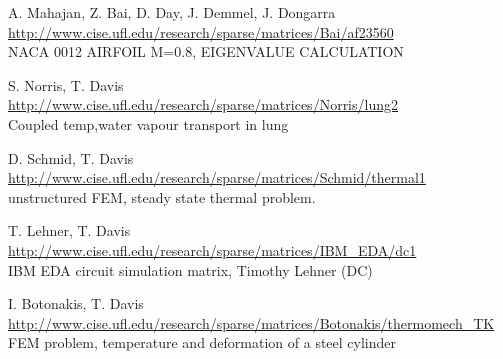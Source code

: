 	{
		{
			 A. Mahajan, Z. Bai, D. Day, J. Demmel, J. Dongarra 
		}
		{
			\url{http://www.cise.ufl.edu/research/sparse/matrices/Bai/af23560 } \\
			 NACA 0012 AIRFOIL  M=0.8, EIGENVALUE CALCULATION
		}
	}
	
	{
		{
			S. Norris, T. Davis
		}
		{
			\url{http://www.cise.ufl.edu/research/sparse/matrices/Norris/lung2} \\
			Coupled temp,water vapour transport in lung
		}
	}

	{
		{
			D. Schmid, T. Davis 
		}
		{
			\url{http://www.cise.ufl.edu/research/sparse/matrices/Schmid/thermal1} \\
			unstructured FEM, steady state thermal problem.
		}
	}

	{
		{
			T. Lehner, T. Davis 
		}
		{
			\url{http://www.cise.ufl.edu/research/sparse/matrices/IBM_EDA/dc1} \\
			IBM EDA circuit simulation matrix, Timothy Lehner (DC)
		}
	}

	{
		{
			I. Botonakis, T. Davis
		}
		{
			\url{http://www.cise.ufl.edu/research/sparse/matrices/Botonakis/thermomech_TK} \\
			FEM problem, temperature and deformation of a steel cylinder
		}
	}

